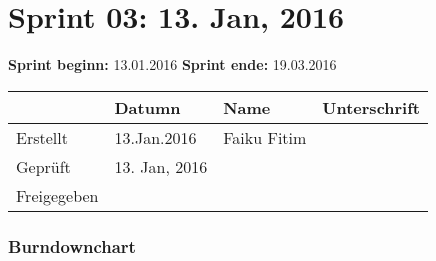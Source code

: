 \chapter{Sprint 03: 13. Jan, 2016}

\textbf{Sprint beginn:} 13.01.2016
\nextline
\textbf{Sprint ende:} 19.03.2016

\begin{tabular}{|l|l|l|l|l|l|}
            & Datumn        & Name            & \multicolumn{3}{l}{Unterschrift} \\ \hline
Erstellt    &  13.Jan.2016  & Faiku Fitim     & \multicolumn{3}{l}{}             \\ \hline
Geprüft     & 13. Jan, 2016 &                 & \multicolumn{3}{l}{}             \\ \hline
Freigegeben &               &                 & \multicolumn{3}{l}{}            
\end{tabular}

\subsection{Burndownchart}

